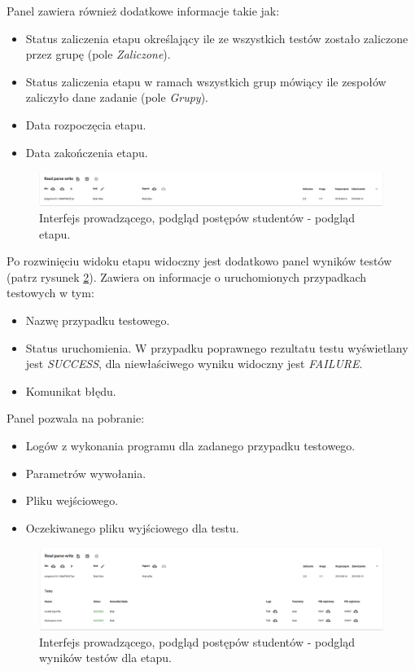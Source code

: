 Panel zawiera również dodatkowe informacje takie jak:
\begin{itemize}
    \item Status zaliczenia etapu określający ile ze wszystkich testów zostało zaliczone przez grupę (pole \textit{Zaliczone}).
    \item Status zaliczenia etapu w ramach wszystkich grup mówiący ile zespołów zaliczyło dane zadanie (pole \textit{Grupy}).
    \item Data rozpoczęcia etapu.
    \item Data zakończenia etapu.
\end{itemize}

\begin{figure}[h]
    \centering
    \includegraphics[width = 15cm]{chapter04/lecturer_preview_stage.png}
    \caption{Interfejs prowadzącego, podgląd postępów studentów - podgląd etapu.}
    \label{fig:lecturer-preview-stage}
\end{figure}

Po rozwinięciu widoku etapu widoczny jest dodatkowo panel wyników testów (patrz rysunek \ref{fig:lecturer-preview-stage-tests}).
Zawiera on informacje o uruchomionych przypadkach testowych w tym:
\begin{itemize}
    \item Nazwę przypadku testowego.
    \item Status uruchomienia. W przypadku poprawnego rezultatu testu wyświetlany jest \textit{SUCCESS}, dla niewłaściwego wyniku widoczny jest \textit{FAILURE}.
    \item Komunikat błędu.
\end{itemize}

Panel pozwala na pobranie:
\begin{itemize}
    \item Logów z wykonania programu dla zadanego przypadku testowego.
    \item Parametrów wywołania.
    \item Pliku wejściowego.
    \item Oczekiwanego pliku wyjściowego dla testu.
\end{itemize}

\begin{figure}[h]
    \centering
    \includegraphics[width = 15cm]{chapter04/lecturer_preview_stage_tests.png}
    \caption{Interfejs prowadzącego, podgląd postępów studentów - podgląd wyników testów dla etapu.}
    \label{fig:lecturer-preview-stage-tests}
\end{figure}

